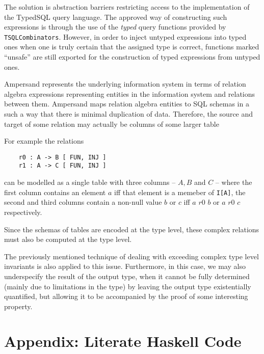 \begin{description}[leftmargin=1em]
  The solution is abstraction barriers restricting access to the implementation of
  the TypedSQL query language. The approved way of constructing such expressions
  is through the use of the \emph{typed} query functions provided by
  \texttt{TSQLCombinators}. However, in order to inject untyped expressions
  into typed ones when one is truly certain that the assigned type is correct,
  functions marked ``unsafe'' are still exported for the construction of 
  typed expressions from untyped ones. 

\item[Relationship between SQL schemata and relation algebra]
  Ampersand represents the underlying information system in terms of relation algebra
  expressions representing entities in the information system and relations between them.
  Ampersand maps relation algebra entities to SQL schemas in a such a way that 
  there is minimal duplication of data. Therefore, the source and target of some 
  relation may actually be columns of some larger table 

  For example the relations 
  \begin{verbatim} 
    r0 : A -> B [ FUN, INJ ] 
    r1 : A -> C [ FUN, INJ ]  
  \end{verbatim}
  \vspace{-2em}
  can be modelled as a single table with three columns -- $A, B$ and $C$ --
  where the first column contains an element $a$ iff that element is a memeber
  of \texttt{I[A]}, the second and third columns contain a non-null value $b$ or
  $c$ iff $a\,\,r0\,\,b$ or $a\,\,r0\,\,c$ respectively. 

 Since the schemas of tables are encoded at the type level, these complex relations
  must also be computed at the type level.

  The previously mentioned technique of dealing with exceeding complex type level invariants
  is also applied to this issue. Furthermore, in this case, we may also underspecify the 
  result of the output type, when it cannot be fully determined (mainly due to limitations 
  in the type) by leaving the output type existentially quantified, but allowing it to 
  be accompanied by the proof of some interesting property. 

\end{description} 

\chapter*{Appendix: Literate Haskell Code}
